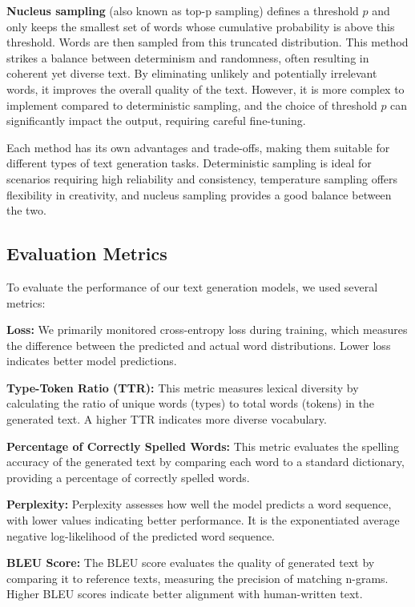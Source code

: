 \documentclass{article}
\begin{document}
\textbf{Nucleus sampling} (also known as top-p sampling) defines a threshold \(p\) and only keeps the smallest set of words whose cumulative probability is above this threshold. Words are then sampled from this truncated distribution. This method strikes a balance between determinism and randomness, often resulting in coherent yet diverse text. By eliminating unlikely and potentially irrelevant words, it improves the overall quality of the text. However, it is more complex to implement compared to deterministic sampling, and the choice of threshold \(p\) can significantly impact the output, requiring careful fine-tuning.

Each method has its own advantages and trade-offs, making them suitable for different types of text generation tasks. Deterministic sampling is ideal for scenarios requiring high reliability and consistency, temperature sampling offers flexibility in creativity, and nucleus sampling provides a good balance between the two.


\subsection{Evaluation Metrics}

To evaluate the performance of our text generation models, we used several metrics:

\textbf{Loss:} We primarily monitored cross-entropy loss during training, which measures the difference between the predicted and actual word distributions. Lower loss indicates better model predictions.

\textbf{Type-Token Ratio (TTR):} This metric measures lexical diversity by calculating the ratio of unique words (types) to total words (tokens) in the generated text. A higher TTR indicates more diverse vocabulary.

\textbf{Percentage of Correctly Spelled Words:} This metric evaluates the spelling accuracy of the generated text by comparing each word to a standard dictionary, providing a percentage of correctly spelled words.

\textbf{Perplexity:} Perplexity assesses how well the model predicts a word sequence, with lower values indicating better performance. It is the exponentiated average negative log-likelihood of the predicted word sequence.

\textbf{BLEU Score:} The BLEU score \cite{10.3115/1073083.1073135} evaluates the quality of generated text by comparing it to reference texts, measuring the precision of matching n-grams. Higher BLEU scores indicate better alignment with human-written text.
\end{document}
